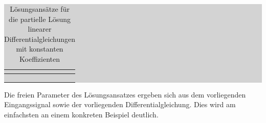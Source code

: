 \begin{table}[H]
\caption{Lösungsansätze für die partielle Lösung linearer Differentialgleichungen mit konstanten Koeffizienten}
\setlength{\fboxsep}{0pt}%
\colorbox{lightgray}{%
%
\begin{tabular}{| c | c |}
\hline
\parbox[c][0.28in][c]{3.3in}{\smallskip\centering\textbf{\selectfont{Eingangssignal u(t) für $t \geqslant 0$}}} & \parbox[c][0.28in][c]{3.3in}{\smallskip\centering\textbf{}}\\ \hline

\parbox[c][0.64in][c]{3.3in}{} &
\parbox[c][0.64in][c]{3.3in}{}\\ \hline

\parbox[c][1in][c]{3.3in}{} & \parbox[c][1in][c]{3.3in}{}\\ \hline

\parbox[c][1in][c]{3.3in}{} &
\parbox[c][1in][c]{3.3in}{}\\ \hline

\end{tabular}%
}
\label{tab:threefive}
\end{table}

\noindent Die freien Parameter des Lösungsansatzes ergeben sich aus dem vorliegenden Eingangssignal sowie
der vorliegenden Differentialgleichung. Dies wird am einfachsten an einem konkreten Beispiel deutlich.\bigskip

